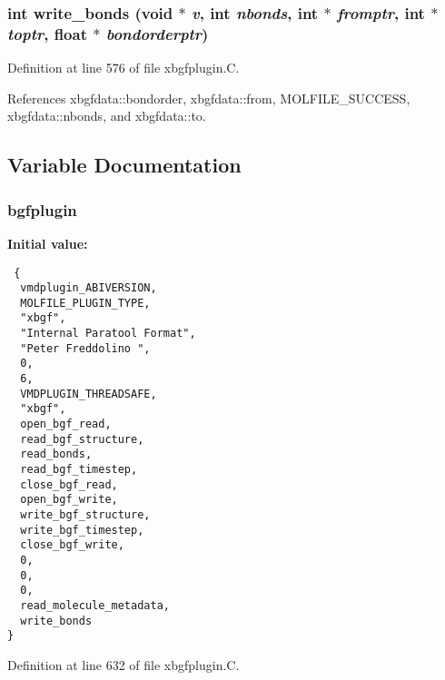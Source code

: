 \subsubsection{\setlength{\rightskip}{0pt plus 5cm}int write\_\-bonds (void $\ast$ {\em v}, int {\em nbonds}, int $\ast$ {\em fromptr}, int $\ast$ {\em toptr}, float $\ast$ {\em bondorderptr})\hspace{0.3cm}{\tt  [static]}}\label{xbgfplugin_8C_a13}




Definition at line 576 of file xbgfplugin.C.

References xbgfdata::bondorder, xbgfdata::from, MOLFILE\_\-SUCCESS, xbgfdata::nbonds, and xbgfdata::to.

\subsection{Variable Documentation}
\subsubsection{ bgfplugin\hspace{0.3cm}{\tt  [static]}}\label{xbgfplugin_8C_a1}


{\bf Initial value:}

\footnotesize\begin{verbatim} {
  vmdplugin_ABIVERSION,
  MOLFILE_PLUGIN_TYPE,                      
  "xbgf",                                    
  "Internal Paratool Format",
  "Peter Freddolino ",    
  0,                                        
  6,                                        
  VMDPLUGIN_THREADSAFE,                     
  "xbgf",
  open_bgf_read,
  read_bgf_structure,
  read_bonds,
  read_bgf_timestep,
  close_bgf_read,
  open_bgf_write,
  write_bgf_structure,
  write_bgf_timestep,
  close_bgf_write,
  0,                            
  0,                            
  0,
  read_molecule_metadata,
  write_bonds  
}\end{verbatim}\normalsize 


Definition at line 632 of file xbgfplugin.C.